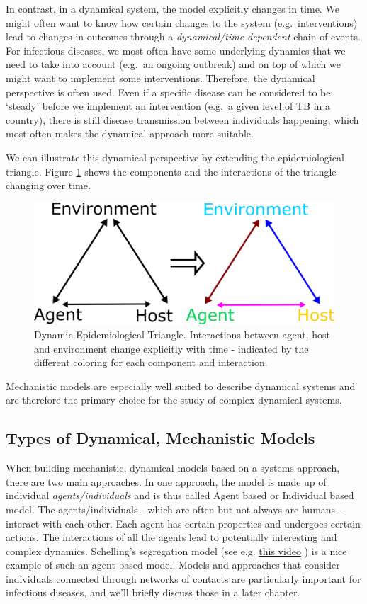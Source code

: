 \documentclass[]{book}
\theoremstyle{definition}
\theoremstyle{definition}
\theoremstyle{definition}
\theoremstyle{remark}
\begin{document}
In contrast, in a dynamical system, the model explicitly changes in
time. We might often want to know how certain changes to the system
(e.g.~interventions) lead to changes in outcomes through a
\emph{dynamical/time-dependent} chain of events. For infectious
diseases, we most often have some underlying dynamics that we need to
take into account (e.g.~an ongoing outbreak) and on top of which we
might want to implement some interventions. Therefore, the dynamical
perspective is often used. Even if a specific disease can be considered
to be `steady' before we implement an intervention (e.g.~a given level
of TB in a country), there is still disease transmission between
individuals happening, which most often makes the dynamical approach
more suitable.

We can illustrate this dynamical perspective by extending the
epidemiological triangle. Figure \ref{fig:dynamictriangle} shows the
components and the interactions of the triangle changing over time.

\begin{figure}
\centering
\includegraphics{./images/moving-triangle.png}
\caption{\label{fig:dynamictriangle}Dynamic Epidemiological Triangle.
Interactions between agent, host and environment change explicitly with
time - indicated by the different coloring for each component and
interaction.}
\end{figure}

Mechanistic models are especially well suited to describe dynamical
systems and are therefore the primary choice for the study of complex
dynamical systems.

\subsection{Types of Dynamical, Mechanistic
Models}\label{types-of-dynamical-mechanistic-models}

When building mechanistic, dynamical models based on a systems approach,
there are two main approaches. In one approach, the model is made up of
individual \emph{agents/individuals} and is thus called Agent based or
Individual based model. The agents/individuals - which are often but not
always are humans - interact with each other. Each agent has certain
properties and undergoes certain actions. The interactions of all the
agents lead to potentially interesting and complex dynamics. Schelling's
segregation model (see e.g. \href{https://youtu.be/dFl3Cfw12bo}{this
video} ) is a nice example of such an agent based model. Models and
approaches that consider individuals connected through networks of
contacts are particularly important for infectious diseases, and we'll
briefly discuss those in a later chapter.
\end{document}
